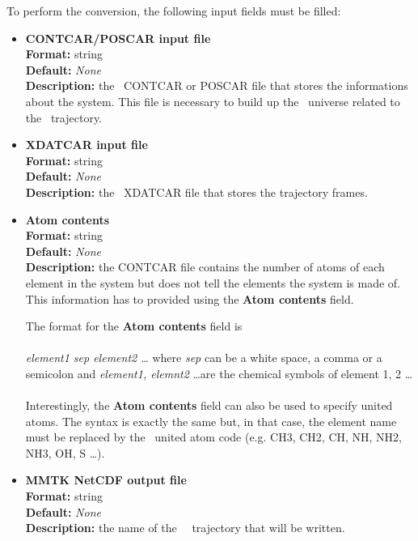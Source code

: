 \documentclass[a4paper,11pt]{report}
\begin{document}
To perform the conversion, the following input fields must be filled:
\hypertarget{vasp_converter_poscar_contcar_input_file}{}
\begin{itemize}
\item \textbf{CONTCAR/POSCAR input file}\\
\textbf{Format:} string\\
\textbf{Default:} \textit{None}\\
\textbf{Description:} the \VASP\ CONTCAR or POSCAR file that stores the informations about the system. This file is 
necessary to build up the \MMTK\ universe related to the \MMTK\ trajectory.

\hypertarget{vasp_converter_xdatcar_input_file}{}
\item \textbf{XDATCAR input file}\\
\textbf{Format:} string\\
\textbf{Default:} \textit{None}\\
\textbf{Description:} the \VASP\ XDATCAR file that stores the trajectory frames.

\hypertarget{vasp_converter_atom_contents}{}
\item \textbf{Atom contents}\\
\textbf{Format:} string\\
\textbf{Default:} \textit{None}\\
\textbf{Description:} the CONTCAR file contains the number of atoms of each element in the system but does not tell the elements the system is 
made of. This information has to provided using the \textbf{Atom contents} field. 

The format for the \textbf{Atom contents} field is
\\\\
\textit{element1 sep element2 \ldots } where \textit{sep} can be a white space, a comma or a semicolon and 
\textit{element1, elemnt2} \ldots are the chemical symbols of element 1, 2 \ldots
\\\\
Interestingly, the \textbf{Atom contents} field can also be used to specify united atoms. The syntax is exactly the same but, in 
that case, the element name must be replaced by the \MMTK\ united atom code (e.g. CH3, CH2, CH, NH, NH2, NH3, OH, S \ldots ).

\hypertarget{vasp_converter_mmtk_netcdf_output_file}{}
\item \textbf{MMTK NetCDF output file}\\
\textbf{Format:} string\\
\textbf{Default:} \textit{None}\\
\textbf{Description:} the name of the \MMTK\ \NetCDF\ trajectory that will be written.
\end{itemize}
\end{document}
